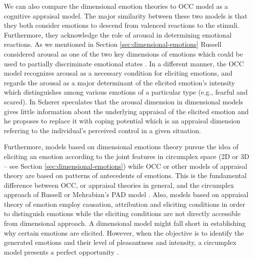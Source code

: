 \documentclass[12pt]{report}
\begin{document}
We can also compare the dimensional emotion theories to OCC model as a cognitive
appraisal model. The major similarity between these two models is that they both
consider emotions to descend from valenced reactions to the stimuli.
Furthermore, they acknowledge the role of arousal in determining emotional
reactions. As we mentioned in Section \ref{sec:dimensional-emotions} Russell
considered arousal as one of the two key dimensions of emotions which could be
used to partially discriminate emotional states
\cite{russell:circumplex-affect}. In a different manner, the OCC model
recognizes arousal as a necessary condition for eliciting emotions, and regards
the arousal as a major determinant of the elicited emotion's intensity which
distinguishes among various emotions of a particular type (e.g., fearful and
scared). In \cite{scherer:what-emotions} Scherer speculates that the arousal
dimension in dimensional models gives little information about the underlying
appraisal of the elicited emotion and he proposes to replace it with coping
potential which is an appraisal dimension referring to the individual's
perceived control in a given situation.

Furthermore, models based on dimensional emotions theory pursue the idea of
eliciting an emotion according to the joint features in circumplex space (2D or
3D -- see Section \ref{sec:dimensional-emotions}) while OCC or other
models of appraisal theory are based on patterns of antecedents of emotions.
This is the fundamental difference between OCC, or appraisal theories in
general, and the circumplex approach of Russell \cite{russell:circumplex-affect}
or Mehrabian's PAD model \cite{mehrabian:pad,mehrabian-russell:pad}. Also,
models based on appraisal theory of emotion employ causation, attribution and
eliciting conditions in order to distinguish emotions while the eliciting
conditions are not directly accessible from dimensional approach. A dimensional
model might fall short in establishing why certain emotions are elicited.
However, when the objective is to identify the generated emotions and their
level of pleasantness and intensity, a circumplex model presents a perfect
opportunity \cite{ahmadpour:occ-dimensional-comparison}.
\end{document}
